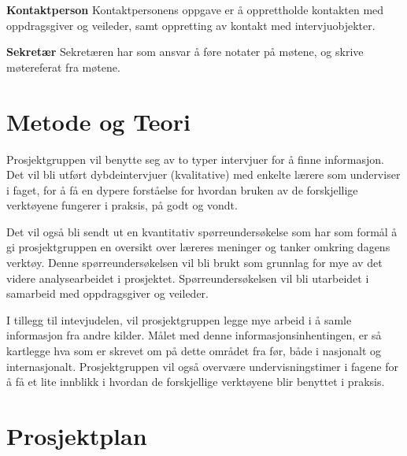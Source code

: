 \documentclass[norsk,a4paper,12pt]{article}
\begin{document}
\noindent\textbf{Kontaktperson}\newline
Kontaktpersonens oppgave er å opprettholde kontakten med oppdragsgiver og veileder, samt oppretting av  kontakt med intervjuobjekter.
\newline

\noindent\textbf{Sekretær}\newline
Sekretæren har som ansvar å føre notater på møtene, og skrive møtereferat fra møtene.


\section{Metode og Teori}

Prosjektgruppen vil benytte seg av to typer intervjuer for å finne informasjon. 
Det vil bli utført dybdeintervjuer (kvalitative) med enkelte lærere som underviser i faget, for å få en dypere forståelse for hvordan bruken av de forskjellige verktøyene fungerer i praksis, på godt og vondt.

Det vil også bli sendt ut en kvantitativ spørreundersøkelse som har som formål å gi prosjektgruppen en oversikt over læreres meninger og tanker omkring dagens verktøy. Denne spørreundersøkelsen vil bli brukt som grunnlag for mye av det videre analysearbeidet i prosjektet. Spørreundersøkelsen vil bli utarbeidet i samarbeid med oppdragsgiver og veileder.

I tillegg til intevjudelen, vil prosjektgruppen legge mye arbeid i å samle informasjon fra andre kilder. Målet med denne informasjonsinhentingen, er så kartlegge hva som er skrevet om på dette området fra før, både i nasjonalt og internasjonalt. Prosjektgruppen vil også overvære undervisningstimer i fagene for å få et lite innblikk i hvordan de forskjellige verktøyene blir benyttet i praksis. 




\newpage

\section{Prosjektplan}
\end{document}
